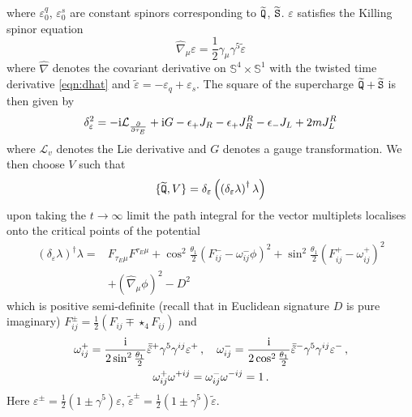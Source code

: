 \documentclass[main.tex]{subfiles}
\begin{document}
where $\varepsilon_0^q$, $\varepsilon_0^s$ are constant spinors corresponding to $\widetilde{\mathtt{Q}}$, $\widetilde{\mathtt{S}}$. $\varepsilon$ satisfies the Killing spinor equation
\begin{equation}
\hat\nabla_{\mu}\varepsilon=\frac{1}{2}\gamma_{\mu}\gamma^5\tilde\varepsilon
\end{equation}
where $\hat\nabla$ denotes the covariant derivative on $\mathbb{S}^4\times \mathbb{S}^1$ with the twisted time derivative \eqref{eqn:dhat} and $\tilde{\varepsilon}=-\varepsilon_q+\varepsilon_s$. The square of the supercharge $\widetilde{\mathtt{Q}}+\widetilde{\mathtt{S}}$ is then given by
\begin{equation}
\delta_{\varepsilon}^2=-\mathrm{i}\mathcal{L}_{\frac{\partial}{\partial\tau_E}}+\mathrm{i} G-\epsilon_+J_R-\epsilon_+J_R^R-\epsilon_-J_L+2mJ_L^R
\end{equation}
where $\mathcal{L}_v$ denotes the Lie derivative and $G$ denotes a gauge transformation. We then choose $V$ such that
\begin{equation}\label{eqn:Qexact}
\{\widetilde{\mathtt{Q}},V\}=\delta_{\varepsilon}\left(\left(\delta_{\varepsilon}\lambda\right)^{\dagger}\lambda\right)
\end{equation}
upon taking the $t\to\infty$ limit the path integral for the vector multiplets localises onto the critical points of the potential 
\begin{equation}\label{eqn:potential}
\begin{aligned}
\left(\delta_{\varepsilon}\lambda\right)^{\dagger}\lambda=&F_{\tau_E\mu}F^{\tau_E\mu}+\cos^2\frac{\theta_1}{2}\left(F_{ij}^--\omega_{ij}^-\phi\right)^2+\sin^2\frac{\theta_1}{2}\left(F_{ij}^+-\omega^+_{ij}\right)^2\\
&+\left(\hat\nabla_{\mu}\phi\right)^2-D^2
\end{aligned}
\end{equation}
which is positive semi-definite (recall that in Euclidean signature $D$ is pure imaginary) $F_{ij}^{\pm}=\frac{1}{2}\left(F_{ij}\mp\star_4F_{ij}\right)$ and
\begin{gather}
\omega_{ij}^+=\frac{\mathrm{i}}{2\sin^2\frac{\theta_1}{2}}\bar{\tilde{\varepsilon}}^+\gamma^5\gamma^{ij}\varepsilon^+\,,\quad \omega_{ij}^-=\frac{\mathrm{i}}{2\cos^2\frac{\theta_1}{2}}\bar{\tilde{\varepsilon}}^-\gamma^5\gamma^{ij}\varepsilon^-\,,\\\omega_{ij}^+\omega^{+ij}=\omega_{ij}^-\omega^{-ij}=1\,.
\end{gather}
Here $\varepsilon^{\pm}=\frac{1}{2}\left(1\pm\gamma^5\right)\varepsilon$, $\tilde\varepsilon^{\pm}=\frac{1}{2}\left(1\pm\gamma^5\right)\tilde\varepsilon$. 
\end{document}
